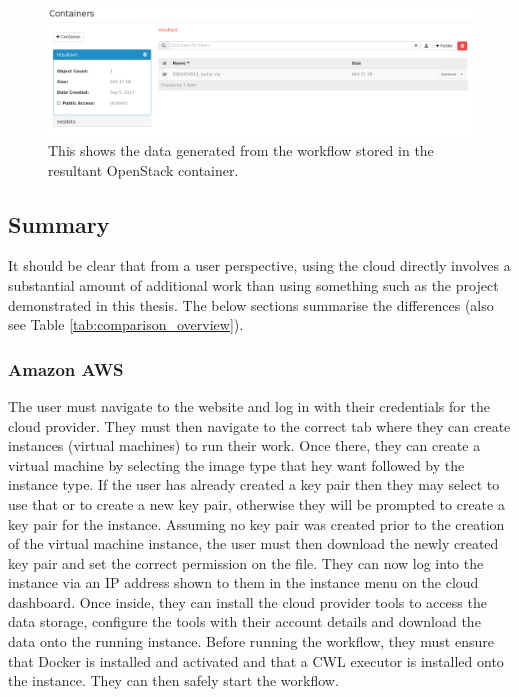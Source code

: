 \begin{figure}[h!]
\centering
\includegraphics[width=\textwidth]{Figures/4_os_swift_result.png}
\decoRule
\caption[OpenStack Swift Container with Result Data]{This shows the data generated from the workflow stored in the resultant OpenStack container.}
\label{fig:os_result}
\end{figure}

\subsection{Summary}

It should be clear that from a user perspective, using the cloud directly involves a substantial amount of additional work than using something such as the project demonstrated in this thesis. The below sections summarise the differences (also see Table \ref{tab:comparison_overview}).

\subsubsection{Amazon AWS}
The user must navigate to the website and log in with their credentials for the cloud provider. They must then navigate to the correct tab where they can create instances (virtual machines) to run their work. Once there, they can create a virtual machine by selecting the image type that hey want followed by the instance type. If the user has already created a key pair then they may select to use that or to create a new key pair, otherwise they will be prompted to create a key pair for the instance. Assuming no key pair was created prior to the creation of the virtual machine instance, the user must then download the newly created key pair and set the correct permission on the file. They can now log into the instance via an IP address shown to them in the instance menu on the cloud dashboard. Once inside, they can install the cloud provider tools to access the data storage, configure the tools with their account details and download the data onto the running instance. Before running the workflow, they must ensure that Docker is installed and activated and that a CWL executor is installed onto the instance. They can then safely start the workflow.

